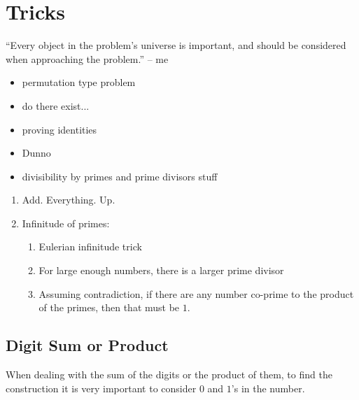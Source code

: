 \section{Tricks}
	
	
	
	``Every object in the problem's universe is important, and should be considered when approaching the problem.'' -- me
	
	
	
	
	
	\begin{itemize}
		
		
		\item permutation type problem
		\item do there exist...
		\item proving identities
		\item Dunno
		\item divisibility by primes and prime divisors stuff
		
		
	\end{itemize}
	
	
	
	\begin{enumerate}
		
		\item Add. Everything. Up.
		
		\item Infinitude of primes:
		
		\begin{enumerate}
			
			\item Eulerian infinitude trick
			\item For large enough numbers, there is a larger prime divisor
			\item Assuming contradiction, if there are any number co-prime to the product of the primes, then that must be $ 1 $. 
			
			
		\end{enumerate}
		
	\end{enumerate}
	
	
	
	
	
	
	
	\Faka\subsection{Digit Sum or Product}
	
	{When dealing with the sum of the digits or the product of them, to find the construction it is very important to consider $ 0 $ and $ 1 $'s in the number.}
	
